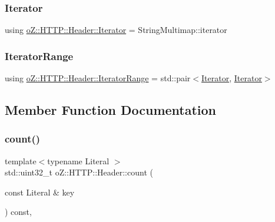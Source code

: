 \mbox{\label{classo_z_1_1_h_t_t_p_1_1_header_a572d529cae124a02fb68df9c3e51c576}} 
\subsubsection{\texorpdfstring{Iterator}{Iterator}}
{\footnotesize\ttfamily using \mbox{\hyperlink{classo_z_1_1_h_t_t_p_1_1_header_a572d529cae124a02fb68df9c3e51c576}{o\+Z\+::\+H\+T\+T\+P\+::\+Header\+::\+Iterator}} =  String\+Multimap\+::iterator}

\mbox{\label{classo_z_1_1_h_t_t_p_1_1_header_a226f04d25adf24d2a683f82ef8327812}} 
\subsubsection{\texorpdfstring{IteratorRange}{IteratorRange}}
{\footnotesize\ttfamily using \mbox{\hyperlink{classo_z_1_1_h_t_t_p_1_1_header_a226f04d25adf24d2a683f82ef8327812}{o\+Z\+::\+H\+T\+T\+P\+::\+Header\+::\+Iterator\+Range}} =  std\+::pair$<$\mbox{\hyperlink{classo_z_1_1_h_t_t_p_1_1_header_a572d529cae124a02fb68df9c3e51c576}{Iterator}}, \mbox{\hyperlink{classo_z_1_1_h_t_t_p_1_1_header_a572d529cae124a02fb68df9c3e51c576}{Iterator}}$>$}



\subsection{Member Function Documentation}
\mbox{\label{classo_z_1_1_h_t_t_p_1_1_header_a59d2eb480ab72b94240e8eb87cf7aee2}} 
\subsubsection{\texorpdfstring{count()}{count()}}
{\footnotesize\ttfamily template$<$typename Literal $>$ \\
std\+::uint32\+\_\+t o\+Z\+::\+H\+T\+T\+P\+::\+Header\+::count (\begin{DoxyParamCaption}\item[{const Literal \&}]{key }\end{DoxyParamCaption}) const\hspace{0.3cm}{\ttfamily [inline]}, {\ttfamily [noexcept]}}



